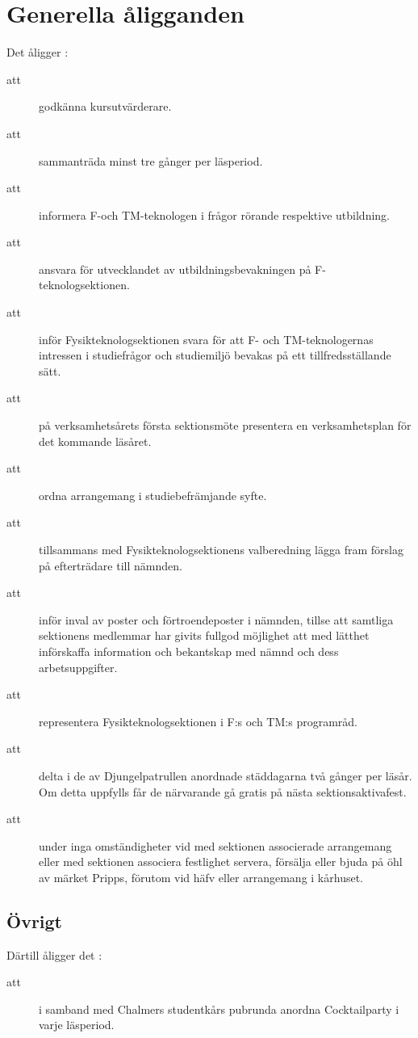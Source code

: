 \section{Generella åligganden}
Det åligger \forening:
    \begin{description}
      \item[att] godkänna kursutvärderare.
      \item[att] sammanträda minst tre gånger per läsperiod.
      \item[att] informera F-och TM-teknologen i frågor rörande respektive utbildning.
      \item[att] ansvara för utvecklandet av utbildningsbevakningen på
				F-tekno\-log\-sektionen.
      \item[att] inför Fysikteknologsektionen svara för att F- och TM-teknologernas
      intressen i studie\-frågor och studiemiljö bevakas på ett
      tillfredsställande sätt.
      \item[att] på verksamhetsårets första sektionsmöte presentera en verksamhetsplan för det kommande läsåret.
      \item[att] ordna arrangemang i studiebefrämjande syfte.
      \item[att] tillsammans med Fysikteknologsektionens valberedning lägga fram förslag på efterträdare till nämnden.
      \item[att] inför inval av poster och förtroendeposter i nämnden, tillse att samtliga sektionens medlemmar har givits fullgod möjlighet att med lätthet införskaffa information och bekantskap med nämnd och dess arbetsuppgifter.
      \item[att] representera Fysikteknologsektionen i F:s och TM:s programråd.
      \item[att] delta i de av Djungelpatrullen anordnade städdagarna två gånger per
      läsår. Om detta uppfylls får de närvarande gå gratis på nästa
      sektionsaktivafest.
      \item[att] under inga omständigheter vid med sektionen associerade arrangemang eller med sektionen associera festlighet servera, försälja eller bjuda på öhl av märket Pripps, förutom vid häfv eller arrangemang i kårhuset.
    \end{description}


\subsection{Övrigt}
 Därtill åligger det \forening :
\begin{description}
    \item[att] i samband med Chalmers studentkårs pubrunda anordna Cocktailparty i varje läsperiod.
\end{description}

